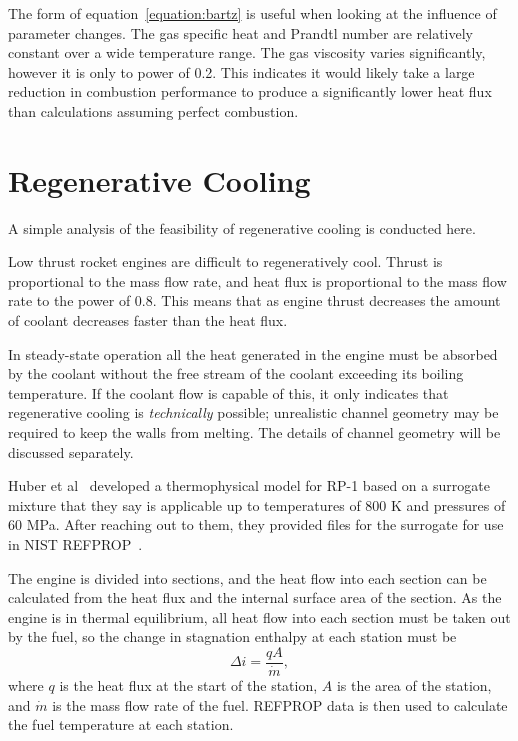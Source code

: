 \documentclass[11pt]{article}
\begin{document}
The form of equation~\ref{equation:bartz} is useful when looking at the influence of parameter changes. The gas specific heat and Prandtl number are relatively constant over a wide temperature range. The gas viscosity varies significantly, however it is only to power of 0.2. This indicates it would likely take a large reduction in combustion performance to produce a significantly lower heat flux than calculations assuming perfect combustion.

\section{Regenerative Cooling}\label{sec:regen}

A simple analysis of the feasibility of regenerative cooling is conducted here.

Low thrust rocket engines are difficult to regeneratively cool. Thrust is proportional to the mass flow rate, and heat flux is proportional to the mass flow rate to the power of 0.8. This means that as engine thrust decreases the amount of coolant decreases faster than the heat flux.

In steady-state operation all the heat generated in the engine must be absorbed by the coolant without the free stream of the coolant exceeding its boiling temperature. If the coolant flow is capable of this, it only indicates that regenerative cooling is \textit{technically} possible; unrealistic channel geometry may be required to keep the walls from melting. The details of channel geometry will be discussed separately.

Huber et al~\cite{huber_preliminary_2009} developed a thermophysical model for RP-1 based on a surrogate mixture that they say is applicable up to temperatures of 800 K and pressures of 60 MPa. After reaching out to them, they provided files for the surrogate for use in NIST REFPROP~\cite{lemmon_nist_2018}.

The engine is divided into sections, and the heat flow into each section can be calculated from the heat flux and the internal surface area of the section. As the engine is in thermal equilibrium, all heat flow into each section must be taken out by the fuel, so the change in stagnation enthalpy at each station must be~\cite{naraghi_simple_2008}
\begin{equation}
  \Delta i = \frac{q A}{\dot{m}},
\end{equation}
where $q$ is the heat flux at the start of the station, $A$ is the area of the station, and $\dot{m}$ is the mass flow rate of the fuel. REFPROP data is then used to calculate the fuel temperature at each station.
\end{document}
